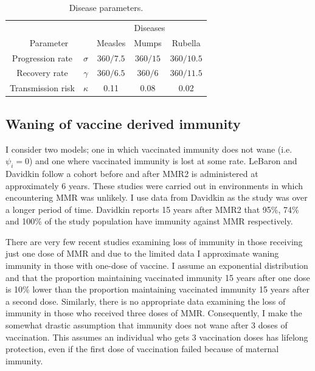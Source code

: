 \documentclass[a4paper,11pt] {scrartcl}
\begin{document}
\begin{table} [h]
\centering
\begin{tabular}{c c c c c}
\toprule
& & \multicolumn{3}{c}{Diseases} \ \\
\multicolumn{2}{c}{Parameter} & Measles & Mumps & Rubella \\
\midrule
Progression rate & $\sigma$ & $360/7.5$ & $360/15$ & $360/10.5$ \\
Recovery rate & $\gamma$ & $360/6.5$ & $360/6$ & $360/11.5$\\
Transmission risk & $\kappa$ & 0.11 & 0.08 & 0.02\\
\bottomrule
\end{tabular}
\caption{Disease parameters.}
\label{tab:estimateparameterdiseaseparameters}
\end{table}

\subsection{Waning of vaccine derived immunity}
\label{subsec:estimateparameterswaning}
I consider two models; one in which vaccinated immunity does not wane (i.e. $\psi_i = 0$) and one where vaccinated immunity is lost at some rate. LeBaron\cite{lebaron2007measlespersistence,lebaron2009mumpspersistence,lebaron2009rubellapersistence} and Davidkin\cite{davidkin2008persistence} follow a cohort before and after MMR2 is administered at approximately 6 years. These studies were carried out in environments in which encountering MMR was unlikely. I use data from Davidkin as the study was over a longer period of time. Davidkin\cite{davidkin2008persistence} reports 15 years after MMR2 that 95\%, 74\% and 100\% of the study population have immunity against MMR respectively.

There are very few recent studies examining loss of immunity in those receiving just one dose of MMR and due to the limited data I approximate waning immunity in those with one-dose of vaccine. I assume an exponential distribution and that the proportion maintaining vaccinated immunity 15 years after one dose is 10\% lower than the proportion maintaining vaccinated immunity 15 years after a second dose. Similarly, there is no appropriate data examining the loss of immunity in those who received three doses of MMR. Consequently, I make the somewhat drastic assumption that immunity does not wane after 3 doses of vaccination. This assumes an individual who gets 3 vaccination doses has lifelong protection, even if the first dose of vaccination failed because of maternal immunity.
\end{document}
